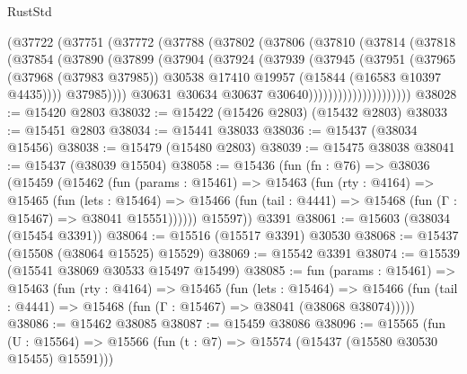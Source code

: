 \begin{lexlean}{RustStd}
\begin{coremodule}
                      (@37722
                        (@37751
                          (@37772
                            (@37788
                              (@37802
                                (@37806
                                  (@37810
                                    (@37814
                                      (@37818
                                        (@37854
                                          (@37890
                                            (@37899
                                              (@37904
                                                (@37924
                                                  (@37939
                                                    (@37945
                                                      (@37951
                                                        (@37965
                                                          (@37968 (@37983 @37985))
                                                          @30538
                                                          @17410
                                                          @19957
                                                          (@15844 (@16583 @10397 @4435))))
                                                      @37985))))
                                              @30631
                                              @30634
                                              @30637
                                              @30640)))))))))))))))))))))
@38028 := @15420 @2803
@38032 := @15422 (@15426 @2803) (@15432 @2803)
@38033 := @15451 @2803
@38034 := @15441 @38033
@38036 := @15437 (@38034 @15456)
@38038 := @15479 (@15480 @2803)
@38039 := @15475 @38038
@38041 := @15437 (@38039 @15504)
@38058 := @15436
    (fun (fn : @76) =>
    @38036
      (@15459
        (@15462
          (fun (params : @15461) =>
          @15463
            (fun (rty : @4164) =>
            @15465
              (fun (lets : @15464) =>
              @15466 (fun (tail : @4441) => @15468 (fun (Γ : @15467) => @38041 @15551))))))
        @15597))
    @3391
@38061 := @15603 (@38034 (@15454 @3391))
@38064 := @15516 (@15517 @3391) @30530
@38068 := @15437 (@15508 (@38064 @15525) @15529)
@38069 := @15542 @3391
@38074 := @15539 (@15541 @38069 @30533 @15497 @15499)
@38085 := fun (params : @15461) =>
  @15463
    (fun (rty : @4164) =>
    @15465
      (fun (lets : @15464) =>
      @15466 (fun (tail : @4441) => @15468 (fun (Γ : @15467) => @38041 (@38068 @38074)))))
@38086 := @15462 @38085
@38087 := @15459 @38086
@38096 := @15565
    (fun (U : @15564) => @15566 (fun (t : @7) => @15574 (@15437 (@15580 @30530 @15455) @15591)))

\end{coremodule}
\end{lexlean}
